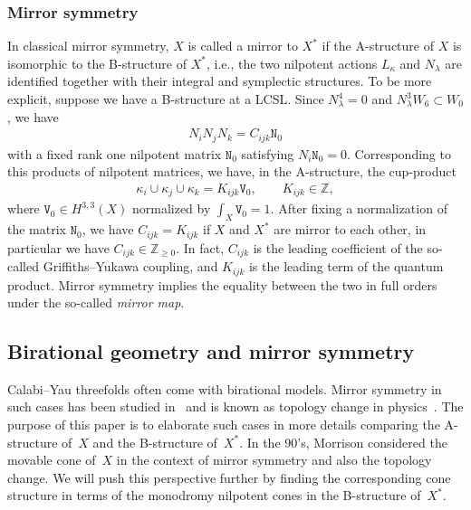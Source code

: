 \documentclass[pdftex]{sigma}
\numberwithin{equation}{section}
\begin{document}
\subsubsection{Mirror symmetry} In classical mirror symmetry, $X$ is called a mirror to $X^{*}$ if the A-structure of $X$ is isomorphic to the
B-structure of $X^{*}$, i.e., the two nilpotent actions $L_{\kappa}$ and $N_{\lambda}$ are identified together with their integral and symplectic structures. To be more explicit, suppose we have a B-structure at a LCSL. Since $N_{\lambda}^{4}=0$ and $N_{\lambda}^{3}W_{6}\subset W_{0}$, we have
\begin{gather*}
N_{i}N_{j}N_{k}=C_{ijk}\mathtt{N}_{0}%
\end{gather*}
with a fixed rank one nilpotent matrix $\mathtt{N}_{0}$ satisfying $N_{i}\mathtt{N}_{0}=0$. Corresponding to this products of nilpotent matrices, we have, in the A-structure, the cup-product
\begin{gather*}
\kappa_{i}\cup\kappa_{j}\cup\kappa_{k}=K_{ijk}\mathtt{V}_{0}, \qquad K_{ijk}\in\mathbb{Z},%
\end{gather*}
where $\mathtt{V}_{0}\in H^{3,3}(X)$ normalized by $\int_{X}\mathtt{V}_{0}=1$. After fixing a normalization of the matrix $\mathtt{N}_{0}$, we have $C_{ijk}=K_{ijk}$ if $X$ and $X^{*}$ are mirror to each other, in particular we have $C_{ijk}\in\mathbb{Z}_{\geq0}$. In fact, $C_{ijk}$ is the leading coefficient of the so-called Griffiths--Yukawa coupling, and $K_{ijk}$ is the leading term of the quantum product. Mirror symmetry implies the equality between the two in full orders under the so-called \textit{mirror map}.

\subsection{Birational geometry and mirror symmetry}

Calabi--Yau threefolds often come with birational models. Mirror symmetry in such cases has been studied in~\cite{MoKahler} and is known as topology change in physics~\cite{AGM}. The purpose of this paper is to elaborate such cases in more details comparing the A-structure of~$X$ and the B-structure of~$X^{*}$. In the 90's, Morrison considered the movable cone of~$X$ in the context of mirror symmetry and also the topology change. We will push this perspective further by finding the corresponding cone structure in terms of the monodromy nilpotent cones in the B-structure of~$X^{*}$.
\end{document}
